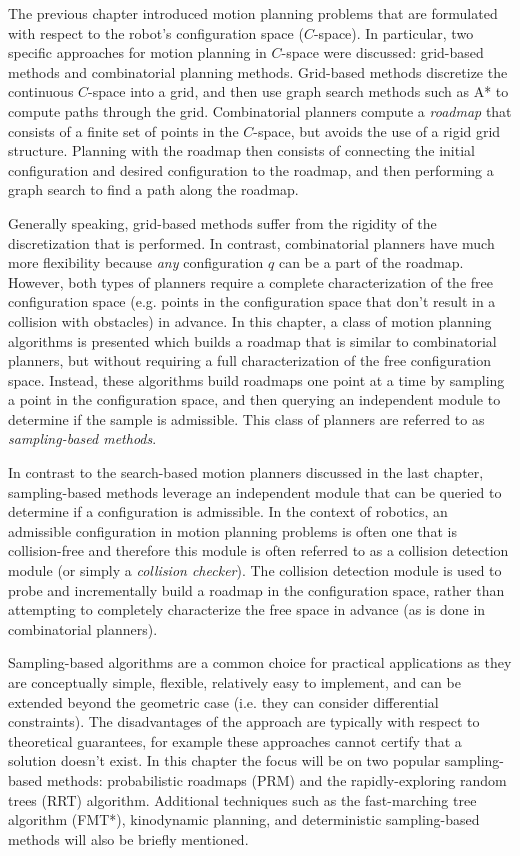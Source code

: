 The previous chapter introduced motion planning problems that are formulated with respect to the robot's configuration space ($C$-space). In particular, two specific approaches for motion planning in $C$-space were discussed: grid-based methods and combinatorial planning methods. Grid-based methods discretize the continuous $C$-space into a grid, and then use graph search methods such as A* to compute paths through the grid. Combinatorial planners compute a \textit{roadmap} that consists of a finite set of points in the $C$-space, but avoids the use of a rigid grid structure. Planning with the roadmap then consists of connecting the initial configuration and desired configuration to the roadmap, and then performing a graph search to find a path along the roadmap.

Generally speaking, grid-based methods suffer from the rigidity of the discretization that is performed. In contrast, combinatorial planners have much more flexibility because \textit{any} configuration $q$ can be a part of the roadmap. However, both types of planners require a complete characterization of the free configuration space (e.g. points in the configuration space that don't result in a collision with obstacles) in advance. In this chapter, a class of motion planning algorithms is presented which builds a roadmap that is similar to combinatorial planners, but without requiring a full characterization of the free configuration space. Instead, these algorithms build roadmaps one point at a time by sampling a point in the configuration space, and then querying an independent module to determine if the sample is admissible. This class of planners are referred to as \textit{sampling-based methods}\cite{LaValle2006}.


In contrast to the search-based motion planners discussed in the last chapter, sampling-based methods leverage an independent module that can be queried to determine if a configuration is admissible. In the context of robotics, an admissible configuration in motion planning problems is often one that is collision-free and therefore this module is often referred to as a collision detection module (or simply a \textit{collision checker}).
The collision detection module is used to probe and incrementally build a roadmap in the configuration space, rather than attempting to completely characterize the free space in advance (as is done in combinatorial planners). 

Sampling-based algorithms are a common choice for practical applications as they are conceptually simple, flexible, relatively easy to implement, and can be extended beyond the geometric case (i.e. they can consider differential constraints). The disadvantages of the approach are typically with respect to theoretical guarantees, for example these approaches cannot certify that a solution doesn't exist. In this chapter the focus will be on two popular sampling-based methods: probabilistic roadmaps (PRM) and the rapidly-exploring random trees (RRT) algorithm. Additional techniques such as the fast-marching tree algorithm (FMT*), kinodynamic planning, and deterministic sampling-based methods will also be briefly mentioned. 

